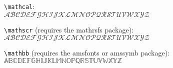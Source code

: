 \documentclass[12pt]{article}
\newcommand{\upperalphabet}{ABCDEFGHIJKLMNOPQRSTUVWXYZ}
\begin{document}
\texttt{\textbackslash mathcal}:\\
$\mathcal{\upperalphabet}$

\texttt{\textbackslash mathscr} (requires the mathrsfs package):\\
$\mathscr{\upperalphabet}$

\texttt{\textbackslash mathbb} (requires the amsfonts or amssymb package):\\
$\mathbb{\upperalphabet}$
\end{document}
